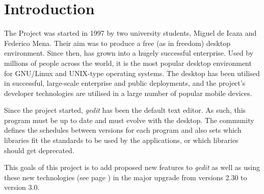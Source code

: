 

\chapter{Introduction}

The \GNOME Project was started in 1997 by two university students, Miguel de Icaza and Federico Mena. Their aim was to produce a free (as in freedom) desktop environment. Since then, \GNOME has grown into a hugely successful enterprise. Used by millions of people across the world, it is the most popular desktop environment for GNU/Linux and UNIX-type operating systems. The desktop has been utilised in successful, large-scale enterprise and public deployments, and the project’s developer technologies are utilised in a large number of popular mobile devices\cite{website:gnome}.


Since the project started, \emph{gedit} has been the \GNOME default text editor. As such, this program must be up to date and must evolve with the desktop. The \GNOME community defines the schedules between versions for each program and also sets which libraries fit the standards to be used by the applications, or which libraries should get deprecated.

This goals of this project is to add proposed new features to \emph{gedit}
as well as using these new technologies (see page \pageref{chap:Technologies}) 
in the major upgrade from versions 2.30 to version 3.0. 




